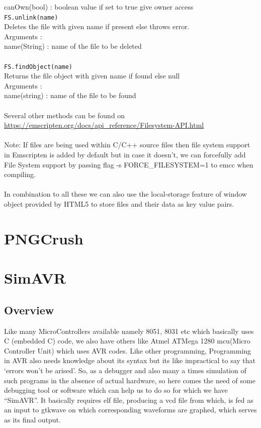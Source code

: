 \documentclass[12pt]{article}
\newcommand\tab[1][1cm]{\hspace*{#1}}
\begin{document}
\tab canOwn(bool) : boolean value if set to true give owner access\\
\texttt{FS.unlink(name)}\\
Deletes the file with given name if present else throws error.\\
Arguments :\\
\tab name(String) : name of the file to be deleted\\ \\
\texttt{FS.findObject(name)}\\
Returns the file object with given name if found else null\\
Arguments :\\
\tab name(string) : name of the file to be found\\ \\
Several other methods can be found on \url{https://emscripten.org/docs/api_reference/Filesystem-API.html}\\ \\
Note: If files are being used within C/C++ source files then file system support in Emscripten is added by default but in case it doesn’t,  we can forcefully add File System support by passing flag -s FORCE\_FILESYSTEM=1 to emcc when compiling.\\ \\
In combination to all these we can also use the local-storage feature of window object provided by HTML5 to store files and their data as key value pairs.

\pagebreak

\section{PNGCrush}



\pagebreak

\section{SimAVR}
\subsection{Overview}
Like many MicroControllers available namely 8051, 8031 etc which basically uses C (embedded C) code, we also have others like Atmel ATMega 1280 mcu(Micro Controller Unit) which uses AVR codes. Like other programming, Programming in AVR also needs knowledge about its syntax but its like impractical to say that ‘errors won’t be arised’. So, as a debugger and also many a times simulation of such programs in the absence of actual hardware, so here comes the need of some debugging tool or software which can help us to do so for which we have “SimAVR”. It basically requires elf file, producing a vcd file from which, is fed as an input to gtkwave on which corresponding waveforms are graphed, which serves as its final output.
\end{document}
